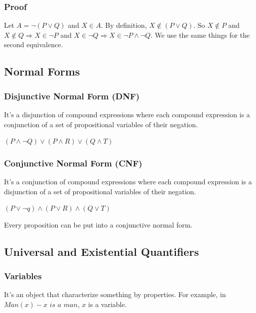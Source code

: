 \documentclass{article}
\begin{document}
\subsubsection{Proof}
\begin{tcolorbox}[width=12.1cm]
Let $ A = \neg(P \vee Q) $ and $ X \in A $. By definition, $ X \notin (P \vee Q) $. So $ X \notin P $ and $ X \notin Q \Rightarrow X \in \neg P $ and $ X \in \neg Q \Rightarrow X \in \neg P \wedge \neg Q $. We use the same things for the second equivalence.
\end{tcolorbox}

\subsection{Normal Forms}
\subsubsection{Disjunctive Normal Form (DNF)} It's a disjunction of compound expressions where each compound expression is a conjunction of a set of propositional variables of their negation.
\begin{center}
$ (P \wedge \neg Q) \vee (P \wedge R) \vee (Q \wedge T) $
\end{center}

\subsubsection{Conjunctive Normal Form (CNF)} It's a conjunction of compound expressions where each compound expression is a disjunction of a set of propositional variables of their negation.
\begin{center}
$ (P \vee \neg q) \wedge (P \vee R) \wedge (Q \vee T) $
\end{center}

\begin{tcolorbox}[sharp corners, colback=green!30, colframe=green!80!blue, title=Theorem Of CNF]
Every proposition can be put into a conjunctive normal form.
\end{tcolorbox}

\subsection{Universal and Existential Quantifiers}
\subsubsection{Variables} It's an object that characterize something by properties. For example, in $ Man(x) - \textit{x is a man} $, $ x $ is a variable.
\end{document}
